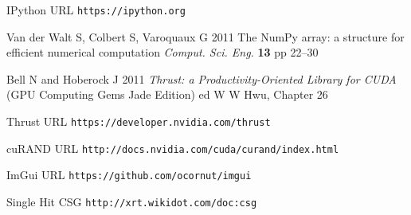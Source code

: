 \documentclass[a4paper]{jpconf}
\begin{document}
\begin{thebibliography}{9}
IPython URL {\tt https://ipython.org}

Van der Walt S, Colbert S, Varoquaux G 
2011 
The NumPy array: a structure for efficient numerical computation
{\it Comput. Sci. Eng.} {\bf 13} pp 22--30

%

Bell N and Hoberock J 
2011
{\it Thrust: a Productivity-Oriented Library for CUDA}
(GPU Computing Gems Jade Edition) ed W W Hwu, Chapter 26   

Thrust URL {\tt https://developer.nvidia.com/thrust}

cuRAND URL {\tt http://docs.nvidia.com/cuda/curand/index.html}


%
%

ImGui URL {\tt https://github.com/ocornut/imgui}

Single Hit CSG
{\tt http://xrt.wikidot.com/doc:csg}

%
%

\end{thebibliography}
\end{document}
